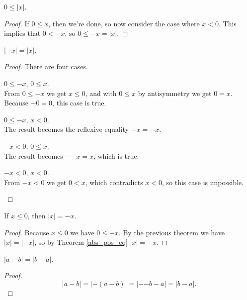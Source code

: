 \documentclass[../../math.tex]{subfiles}
\begin{document}
\begin{theorem}
    $0 \leq |x|$.
\end{theorem}
\begin{proof}
    If $0 \leq x$, then we're done, so now consider the case where $x < 0$.
    This implies that $0 < -x$, so $0 \leq -x = |x|$.
\end{proof}

\begin{theorem}
    $|{-x}| = |x|$.
\end{theorem}
\begin{proof}
    There are four cases.
    \begin{case} $0 \leq -x$, $0 \leq x$. \\
        From $0 \leq -x$ we get $x \leq 0$, and with $0 \leq x$ by antisymmetry
        we get $0 = x$.  Because $-0 = 0$, this case is true.
    \end{case}
    \begin{case} $0 \leq -x$, $x < 0$. \\
        The result becomes the reflexive equality $-x = -x$.
    \end{case}
    \begin{case} $-x < 0$, $0 \leq x$. \\
        The result becomes $-{-x} = x$, which is true.
    \end{case}
    \begin{case} $-x < 0$, $x < 0$. \\
        From $-x < 0$ we get $0 < x$, which contradicts $x < 0$, so this case is
        impossible.
    \end{case}
\end{proof}

\begin{theorem}
    If $x \leq 0$, then $|x| = -x$.
\end{theorem}
\begin{proof}
    Because $x \leq 0$ we have $0 \leq -x$.  By the previous theorem we have
    $|x| = |{-x}|$, so by Theorem \ref{abs_pos_eq} $|x| = -x$.
\end{proof}

\begin{theorem}
    $|a - b| = |b - a|$.
\end{theorem}
\begin{proof}
    \[
        |a - b| = |{-(a - b)}| = |{-{-b}} - a| = |b - a|.
    \]
\end{proof}
\end{document}
